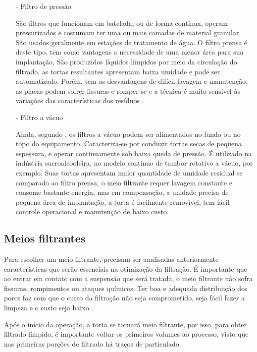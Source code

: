 \begin{enumerate}

\item[-] Filtro de pressão
 
  São filtros que funcionam em batelada, ou de forma contínua, operam
  pressurizados e costumam ter uma ou mais camadas de material granular. São
  usados geralmente em estações de tratamento de água. O filtro prensa é deste
  tipo, tem como vantagens a necessidade de uma menor área para sua implantação,
  São produzidos líquidos límpidos por meio da circulação do filtrado, as tortas
  resultantes apresentam baixa umidade e pode ser automatizado. Porém, tem as
  desvantagens de difícil lavagem e manutenção, as placas podem sofrer fissuras
  e romper-se e a técnica é muito sensível às variações das características dos
  resíduos .


\item[-] Filtro a vácuo

  Ainda, segundo , os filtros a vácuo podem ser alimentados
  no fundo ou no topo do equipamento. Caracteriza-se por conduzir tortas secas
  de pequena espessura, e operar continuamente sob baixa queda de pressão. É
  utilizado na indústria sucroalcooleira, no modelo contínuo de tambor rotativo
  a vácuo, por exemplo. Suas tortas apresentam maior quantidade de umidade
  residual se comparado ao filtro prensa, o meio filtrante requer lavagem
  constante e consome bastante energia, mas em compensação, a unidade precisa de
  pequena área de implantação, a torta é facilmente removível, tem fácil
  controle operacional e manutenção de baixo custo.


\end{enumerate}


\subsection{Meios filtrantes}
\label{subsec:meiosfiltrantes}

Para escolher um meio filtrante, precisam ser analisadas anteriormente
características que serão essenciais na otimização da filtração. É importante
que ao entrar em contato com a suspensão que será tratada, o meio filtrante não
sofra fissuras, rompimentos ou ataques químicos. Ter boa e adequada distribuição
dos poros faz com que o curso da filtração não seja comprometido, seja fácil
fazer a limpeza e o custo seja baixo .

Após o início da operação, a torta se tornará meio filtrante, por isso, para
obter filtrado límpido, é importante voltar os primeiros volumes ao processo,
visto que nas primeiras porções de filtrado há traços de particulado.

